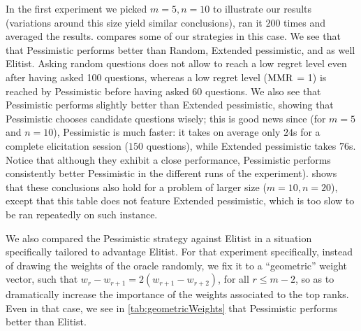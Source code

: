 \documentclass[sigconf, anonymous]{aamas}
\begin{document}
In the first experiment we picked $m = 5, n = 10$ to illustrate our results (variations around this size yield similar conclusions), ran it $200$ times and averaged the results.
 compares some of our strategies in this case.
We see that that Pessimistic performs better than Random,  Extended pessimistic, %
and as well Elitist.
Asking random questions does not allow to reach a low regret level even after having asked 100 questions, whereas a low regret level ($\operatorname{MMR}$ = 1) is reached by Pessimistic before having asked 60 questions.
We also see that Pessimistic performs slightly better than Extended pessimistic, showing that Pessimistic chooses candidate questions wisely; this is good news since (for $m = 5$ and $n = 10$), Pessimistic is much faster: it takes on average only $24$s for a complete elicitation session ($150$ questions), while Extended pessimistic takes $76$s. Notice that although they exhibit a close performance, Pessimistic performs %
consistently better Pessimistic in the different runs of the experiment).
 shows that these conclusions also hold for a problem of larger size ($m = 10, n = 20$), except that this table does not feature Extended pessimistic, which is too slow to be ran repeatedly on such instance.

We also compared the Pessimistic strategy against Elitist in a situation specifically tailored to advantage Elitist. For that experiment specifically, instead of drawing the weights of the oracle randomly, we fix it to a “geometric” weight vector, such that $w_r - w_{r + 1} = 2(w_{r + 1} - w_{r + 2})$, for all $r ≤ m - 2$, so as to dramatically increase the importance of the weights associated to the top ranks. Even in that case, we see in \cref{tab:geometricWeights} that Pessimistic performs better than Elitist.

\end{document}

